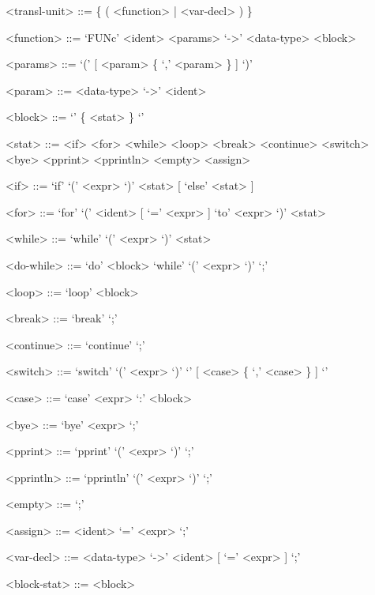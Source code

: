 \documentclass[12pt, a4paper]{article}
\begin{document}
    \setlength{\grammarparsep}{0.6em} %
    \setlength{\grammarindent}{10em} %

    \begin{grammar}

        <transl-unit> ::= \{ ( <function> | <var-decl> ) \}

        <function> ::= `FUNc' <ident> <params> `->' <data-type> <block>

        <params> ::= `(' [ <param> \{ `,' <param> \} ] `)'

        <param> ::= <data-type> `->' <ident>

        <block> ::= `{' \{ <stat> \} `}'

        <stat> ::= <if>
        \alt <for>
        \alt <while>
        \alt <loop>
        \alt <break>
        \alt <continue>
        \alt <switch>
        \alt <bye>
        \alt <pprint>
        \alt <pprintln>
        \alt <empty>
        \alt <assign>

        <if> ::= `if' `(' <expr> `)' <stat> [ `else' <stat> ]

        <for> ::= `for' `(' <ident> [ `=' <expr> ] `to' <expr> `)' <stat>

        <while> ::= `while' `(' <expr> `)' <stat>

        <do-while> ::= `do' <block> `while' `(' <expr> `)' `;'

        <loop> ::= `loop' <block>

        <break> ::= `break' `;'

        <continue> ::= `continue' `;'

        <switch> ::= `switch' `(' <expr> `)' `{' [ <case> \{ `,' <case> \} ] `}'

        <case> ::= `case' <expr> `:' <block>

        <bye> ::= `bye' <expr> `;'

        <pprint> ::= `pprint' `(' <expr> `)' `;'

        <pprintln> ::= `pprintln' `(' <expr> `)' `;'

        <empty> ::= `;'

        <assign> ::= <ident> `=' <expr> `;'

        <var-decl> ::= <data-type> `->' <ident> [ `=' <expr> ] `;'

        <block-stat> ::= <block>


\end{grammar}
\end{document}
